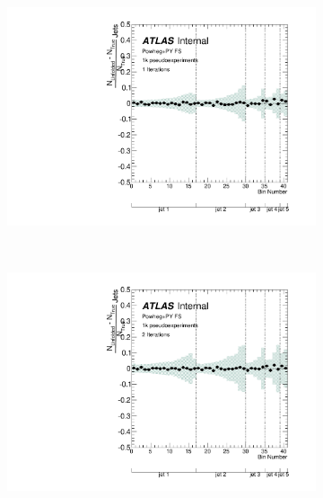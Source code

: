 \clearpage
\begin{figure}
\begin{subfigure}[]{0.5\textwidth}
\includegraphics[width=\textwidth]{fig/Stress/117050fullsim/FracBias1Iterations.pdf}
\end{subfigure}
~
\begin{subfigure}[]{0.5\textwidth}
\includegraphics[width=\textwidth]{fig/Stress/117050fullsim/FracBias2Iterations.pdf}
\end{subfigure}
\\
\begin{subfigure}[]{0.5\textwidth}

\end{subfigure}
\end{figure}
